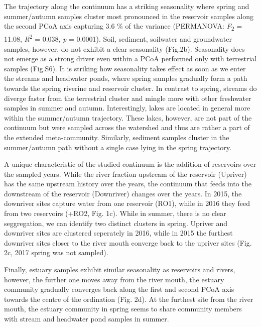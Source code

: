 \documentclass[12pt,a4paper]{article} %
\begin{document}
The trajectory along the continuum has a striking seasonality where spring and summer/autumn samples cluster most pronounced in the reservoir samples along the second PCoA axis capturing 3.6 \% of the variance (PERMANOVA: \textit{F}\textsubscript{2} = 11.08, \textit{R}\textsuperscript{2} = 0.038, \textit{p} = 0.0001). Soil, sediment, soilwater and groundwater samples, however, do not exhibit a clear seasonality (Fig.2b). Seasonality does not emerge as a strong driver even within a PCoA performed only with terrestrial samples (Fig.S6). It is striking how seasonality takes effect as soon as we enter the streams and headwater ponds, where spring samples gradually form a path towards the spring riverine and reservoir cluster. In contrast to spring, streams do diverge faster from the terrestrial cluster and mingle more with other freshwater samples in summer and autumn. Interestingly, lakes are located in general more within the summer/autumn trajectory. These lakes, however, are not part of the continuum but were sampled across the watershed and thus are rather a part of the extended meta-community. Similarly, sediment samples cluster in the summer/autumn path without a single case lying in the spring trajectory.

A unique characteristic of the studied continuum is the addition of reservoirs over the sampled years. While the river fraction upstream of the reservoir (Upriver) has the same upstream history over the years, the continuum that feeds into the downstream of the reservoir (Downriver) changes over the years. In 2015, the downriver sites capture water from one reservoir (RO1), while in 2016 they feed from two reservoirs (+RO2, Fig. 1c). While in summer, there is no clear seggregation, we can identify two distinct clusters in spring. Upriver and downriver sites are clustered seperately in 2016, while in 2015 the furthest downriver sites closer to the river mouth converge back to the upriver sites (Fig. 2c, 2017 spring was not sampled).

Finally, estuary samples exhibit similar seasonality as reservoirs and rivers, however, the further one moves away from the river mouth, the estuary community gradually converges back along the first and second PCoA axis towards the centre of the ordination (Fig. 2d). At the furthest site from the river mouth, the estuary community in spring seems to share community members with stream and headwater pond samples in summer.
\end{document}
